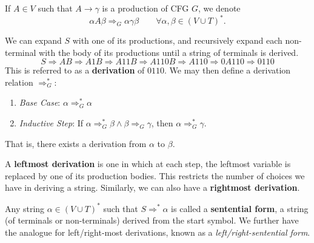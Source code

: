\begin{notation}[$\Rightarrow$] 
  If $A\in V$ such that $A\to \gamma$ is a production of CFG $G$, we denote
  \[\alpha A\beta\Rightarrow_G \alpha\gamma\beta\qquad\forall\alpha,\beta\in
  {\left( V\cup T \right)}^{*}.\]
\end{notation}
\begin{definition}[Derivation]
  We can expand $S$ with one of its productions, and recursively expand each
  non-terminal with the body of its productions until a string of terminals is derived.
  \[S\Rightarrow AB \Rightarrow A1B \Rightarrow A11B \Rightarrow A110B \Rightarrow A110
  \Rightarrow 0A110 \Rightarrow 0110\]
  This is referred to as a \textbf{derivation} of $0110$. We may then define a
  derivation relation $\Rightarrow ^{*}_G$:
  \begin{enumerate}
    \item \textit{Base Case}: $\alpha \Rightarrow _G^{*} \alpha$
    \item \textit{Inductive Step}: If $\alpha \Rightarrow
      _G^{*}\beta\wedge\beta \Rightarrow _G \gamma$, then $\alpha
      \Rightarrow _G^{*}\gamma$.
  \end{enumerate}
  That is, there exists a derivation from $\alpha$ to $\beta$.
\end{definition}

\begin{definition}
  A \textbf{leftmost derivation} is one in which at each step, the leftmost
  variable is replaced by one of its production bodies. This restricts the
  number of choices we have in deriving a string. Similarly, we can also
  have a \textbf{rightmost derivation}.
\end{definition}

\begin{definition}
  Any string $\alpha\in {\left( V\cup T \right) }^{*}$ such that $S \Rightarrow
  ^{*}\alpha$ is called a \textbf{sentential form}, a string (of terminals or
  non-terminals) derived from the start symbol. We further have the
  analogue for left/right-most derivations, known as a
  \textit{left/right-sentential form}.
\end{definition}

